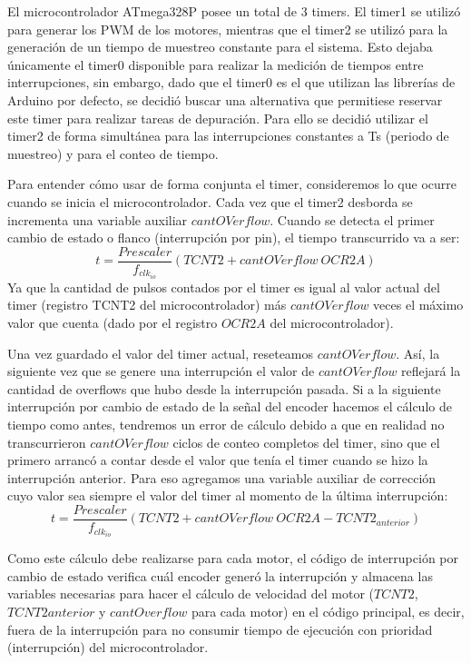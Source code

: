 \documentclass[10pt,conference,a4paper,onecolumn]{article}%
\begin{document}
El microcontrolador ATmega328P posee un total de 3 timers. El timer1 se utilizó para generar los PWM de los motores, mientras que el timer2 se utilizó para la generación de un tiempo de muestreo constante para el sistema. Esto dejaba únicamente el timer0 disponible para realizar la medición de tiempos entre interrupciones,
sin embargo, dado que el timer0 es el que utilizan las librerías de Arduino por defecto, se decidió buscar una alternativa que permitiese reservar este timer para realizar tareas de depuración. Para ello se decidió utilizar el timer2 de forma simultánea para las interrupciones constantes a Ts (periodo de muestreo) y para el conteo de tiempo.

Para entender cómo usar de forma conjunta el timer, consideremos lo que ocurre cuando se inicia el microcontrolador. Cada vez que el timer2 desborda se incrementa una variable auxiliar $cantOVerflow$. Cuando se detecta el primer cambio de estado o flanco (interrupción por pin), el tiempo transcurrido va a ser:
 \begin{equation*}
 t=\frac{Prescaler}{f_{clk_{io}}} (TCNT2+cantOVerflow\ OCR2A)
 \end{equation*}
Ya que la cantidad de pulsos contados por el timer es igual al valor actual del timer (registro TCNT2 del microcontrolador) más $cantOVerflow$ veces el máximo valor que cuenta (dado por el registro $OCR2A$ del microcontrolador).

Una vez guardado el valor del timer actual, reseteamos $cantOVerflow$. Así, la siguiente vez que se genere una interrupción el valor de $cantOVerflow$ reflejará la cantidad de overflows que hubo desde la interrupción pasada. Si a la siguiente interrupción por cambio de estado de la señal del encoder hacemos el cálculo de tiempo como
antes, tendremos un error de cálculo debido a que en realidad no transcurrieron $cantOVerflow$ ciclos de conteo completos del timer, sino que el primero arrancó a contar desde el valor que tenía el timer cuando se hizo la interrupción anterior. Para eso agregamos una variable auxiliar de corrección cuyo valor sea siempre el valor del
timer al momento de la última interrupción:
 \begin{equation}
 t=\frac{Prescaler}{f_{clk_{io}}} (TCNT2+cantOVerflow\ OCR2A-TCNT2_{anterior})
 \end{equation}

Como este cálculo debe realizarse para cada motor, el código de interrupción por cambio de estado verifica cuál encoder generó la interrupción y almacena las variables necesarias para hacer el cálculo de velocidad del motor ($TCNT2$, $TCNT2anterior$ y $cantOverflow$ para cada motor) en el código principal, es decir, fuera de la interrupción para no consumir tiempo de ejecución con prioridad (interrupción) del microcontrolador.
\end{document}
